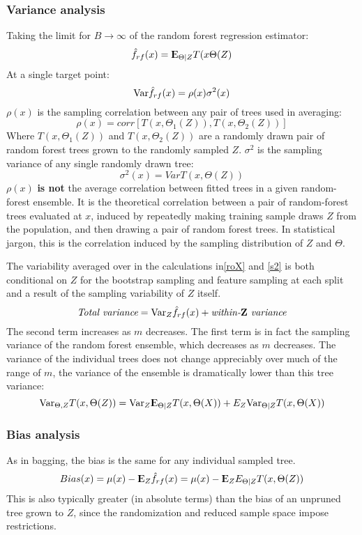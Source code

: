 \subsubsection{Variance analysis}
Taking the limit for $B\rightarrow \infty$ of the random forest regression estimator:
\begin{equation}
\hat{f}_{rf}(x) = {\rm I\kern-.3em E}_{\Theta|Z} T(x \Theta(Z)
\end{equation}
At a single target point:
\begin{equation}
\mathrm{Var} \hat{f}_{rf}(x)  =\rho(x) \sigma^2 (x)
\end{equation}
$\rho(x)$ is the sampling correlation between any pair of trees used in averaging:
\begin{equation}
\rho(x) = corr\left[ T(x,\Theta_1(Z)), T(x,\Theta_2(Z))\right]
\label{roX}
\end{equation}
Where $T(x,\Theta_1(Z))$ and $T(x,\Theta_2(Z))$ are a randomly drawn pair of random forest trees grown to the randomly sampled $Z$. $\sigma^2$ is the sampling variance of any single randomly drawn tree:
\begin{equation}
\sigma^2(x) = Var T(x, \Theta(Z))
\label{s2}
\end{equation}
$\rho(x)$ \textbf{is not} the average correlation between fitted trees in a given random-forest ensemble. It is the theoretical correlation between a pair of random-forest trees evaluated at $x$, induced by repeatedly making training sample draws $Z$ from the population, and then drawing a pair of random forest trees. In statistical jargon, this is the correlation induced by the sampling distribution of $Z$ and $\Theta$.

The variability averaged over in the calculations in\autoref{roX} and \autoref{s2} is both conditional on $Z$ for the bootstrap sampling and feature sampling at each split and a result of the sampling variability of $Z$ itself.
\begin{equation}
\textit{Total variance} = \mathrm{Var}_Z \hat{f}_{rf}(x) + \textit{within-$\mathbf{Z}$ variance}
\end{equation}
The second term increases as $m$ decreases. The first term is in fact the sampling variance of the random forest ensemble, which decreases as $m$ decreases. 
The variance of the individual trees does not change appreciably over much of the range of $m$, the variance of the ensemble is dramatically lower than this tree variance:
\begin{equation}
\mathrm{Var}_{\Theta,Z} T(x, \Theta(Z)) = \mathrm{Var}_Z {\rm I\kern-.3em E}_{\Theta|Z}T(x, \Theta(X)) + E_Z\mathrm{Var}_{\Theta|Z}T(x, \Theta(X))
\end{equation}

\subsubsection{Bias analysis}
As in bagging, the bias is the same for any individual sampled tree.
\begin{equation}
Bias(x) = \mu(x) - {\rm I\kern-.3em E}_Z\hat{f}_{rf}(x) = \mu(x) - {\rm I\kern-.3em E}_Z E_{\Theta|Z}T(x, \Theta(Z))
\end{equation}
This is also typically greater (in absolute terms) than the bias of an unpruned tree grown to $Z$, since the randomization and reduced sample space impose restrictions.